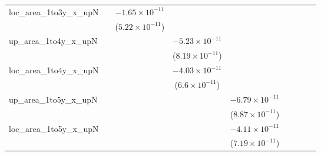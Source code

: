 \begin{tabular}{lcccccccc}
   loc\_area\_1to3y\_x\_upN     &                          & $-1.65\times 10^{-11}$   &                          &                          &                          &                          &                          &   \\   
                                &                          & ($5.22\times 10^{-11}$)  &                          &                          &                          &                          &                          &   \\   
   up\_area\_1to4y\_x\_upN      &                          &                          & $-5.23\times 10^{-11}$   &                          &                          &                          &                          &   \\   
                                &                          &                          & ($8.19\times 10^{-11}$)  &                          &                          &                          &                          &   \\   
   loc\_area\_1to4y\_x\_upN     &                          &                          & $-4.03\times 10^{-11}$   &                          &                          &                          &                          &   \\   
                                &                          &                          & ($6.6\times 10^{-11}$)   &                          &                          &                          &                          &   \\   
   up\_area\_1to5y\_x\_upN      &                          &                          &                          & $-6.79\times 10^{-11}$   &                          &                          &                          &   \\   
                                &                          &                          &                          & ($8.87\times 10^{-11}$)  &                          &                          &                          &   \\   
   loc\_area\_1to5y\_x\_upN     &                          &                          &                          & $-4.11\times 10^{-11}$   &                          &                          &                          &   \\   
                                &                          &                          &                          & ($7.19\times 10^{-11}$)  &                          &                          &                          &   \\   

\end{tabular}
